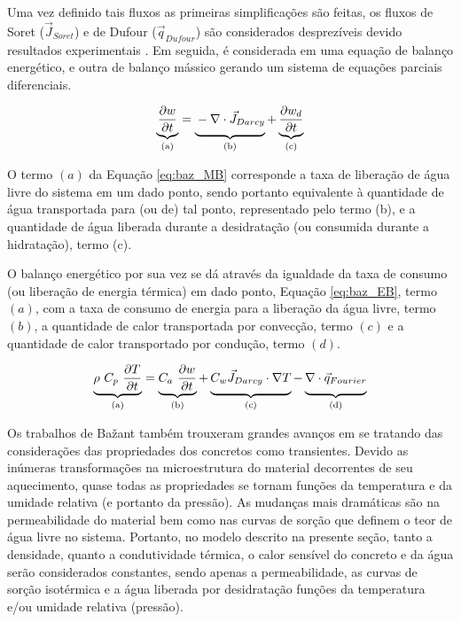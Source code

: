 Uma vez definido tais fluxos as primeiras simplificações são feitas, os fluxos
de Soret ($\vec{J}_{Soret}$) e de Dufour ($\vec{q}_{Dufour}$) são considerados
desprezíveis devido resultados experimentais \cite{bazant1979}. Em
seguida, é considerada em uma equação de balanço energético, e outra de balanço
mássico gerando um sistema de equações parciais diferenciais.

\begin{equation}
  \label{eq:baz_MB}
  \underbrace{\frac{\partial w}{\partial t}}_{\text{(a)}} = \underbrace{\vphantom{ \left(\frac{a}{b}\right) } - \nabla \cdot \vec{J}_{Darcy}}_{\text{(b)}} + \underbrace{\frac{\partial w_d}{\partial t}}_{\text{(c)}}
\end{equation}

O termo $(a)$ da Equação \ref{eq:baz_MB} corresponde a taxa de liberação de água
livre do sistema em um dado ponto, sendo portanto equivalente à quantidade de
água transportada para (ou de) tal ponto, representado pelo termo (b), e a
quantidade de água liberada durante a desidratação (ou consumida durante a
hidratação), termo (c).

O balanço energético por sua vez se dá através da igualdade da taxa de consumo
(ou liberação de energia térmica) em dado ponto, Equação \ref{eq:baz_EB}, termo
$(a)$, com a taxa de consumo de energia para a liberação da água livre, termo
$(b)$, a quantidade de calor transportada por convecção, termo $(c)$ e a
quantidade de calor transportado por condução, termo $(d)$.

\begin{equation}
  \label{eq:baz_EB}
  \underbrace{\rho \ C_p \ \frac{\partial T}{\partial t}}_{\text{(a)}} = \underbrace{C_a \ \frac{\partial w}{\partial t}}_{\text{(b)}} + \underbrace{\vphantom{\left(\frac{a}{b}\right)} C_w \vec{J}_{Darcy}\cdot \nabla T}_{\text{(c)}} - \underbrace{\vphantom{\left(\frac{a}{b}\right)} \nabla \cdot \vec{q}_{Fourier}}_{\text{(d)}}
\end{equation}
    
Os trabalhos de Ba\v{z}ant também trouxeram grandes avanços em se tratando das
considerações das propriedades dos concretos como transientes. Devido as
inúmeras transformações na microestrutura do material decorrentes de seu
aquecimento, quase todas as propriedades se tornam funções da temperatura e da
umidade relativa (e portanto da pressão). As mudanças mais dramáticas são na
permeabilidade do material bem como nas curvas de sorção que definem o teor de
água livre no sistema. Portanto, no modelo descrito na presente seção, tanto a
densidade, quanto a condutividade térmica, o calor sensível do concreto e da
água serão considerados constantes, sendo apenas a permeabilidade, as curvas de
sorção isotérmica e a água liberada por desidratação funções da temperatura e/ou
umidade relativa (pressão).

